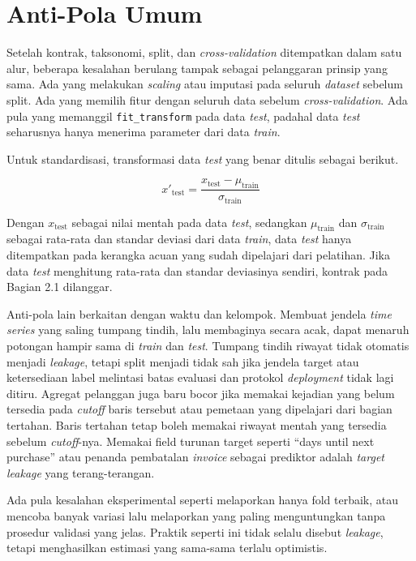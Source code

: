 \section{Anti-Pola Umum}\label{anti-pola-umum}

Setelah kontrak, taksonomi, split, dan \emph{cross-validation} ditempatkan dalam satu alur, beberapa kesalahan berulang tampak sebagai pelanggaran prinsip yang sama. Ada yang melakukan \emph{scaling} atau imputasi pada seluruh \emph{dataset} sebelum split. Ada yang memilih fitur dengan seluruh data sebelum \emph{cross-validation}. Ada pula yang memanggil \passthrough{\lstinline!fit_transform!} pada data \emph{test}, padahal data \emph{test} seharusnya hanya menerima parameter dari data \emph{train}.

Untuk standardisasi, transformasi data \emph{test} yang benar ditulis sebagai berikut.

\[
x'_{\text{test}} = \frac{x_{\text{test}} - \mu_{\text{train}}}{\sigma_{\text{train}}}
\]

Dengan \(x_{\text{test}}\) sebagai nilai mentah pada data \emph{test}, sedangkan \(\mu_{\text{train}}\) dan \(\sigma_{\text{train}}\) sebagai rata-rata dan standar deviasi dari data \emph{train}, data \emph{test} hanya ditempatkan pada kerangka acuan yang sudah dipelajari dari pelatihan. Jika data \emph{test} menghitung rata-rata dan standar deviasinya sendiri, kontrak pada Bagian 2.1 dilanggar.

Anti-pola lain berkaitan dengan waktu dan kelompok. Membuat jendela \emph{time series} yang saling tumpang tindih, lalu membaginya secara acak, dapat menaruh potongan hampir sama di \emph{train} dan \emph{test}. Tumpang tindih riwayat tidak otomatis menjadi \emph{leakage}, tetapi split menjadi tidak sah jika jendela target atau ketersediaan label melintasi batas evaluasi dan protokol \emph{deployment} tidak lagi ditiru. Agregat pelanggan juga baru bocor jika memakai kejadian yang belum tersedia pada \emph{cutoff} baris tersebut atau pemetaan yang dipelajari dari bagian tertahan. Baris tertahan tetap boleh memakai riwayat mentah yang tersedia sebelum \emph{cutoff}-nya. Memakai field turunan target seperti ``days until next purchase'' atau penanda pembatalan \emph{invoice} sebagai prediktor adalah \emph{target leakage} yang terang-terangan.

Ada pula kesalahan eksperimental seperti melaporkan hanya fold terbaik, atau mencoba banyak variasi lalu melaporkan yang paling menguntungkan tanpa prosedur validasi yang jelas. Praktik seperti ini tidak selalu disebut \emph{leakage}, tetapi menghasilkan estimasi yang sama-sama terlalu optimistis.

